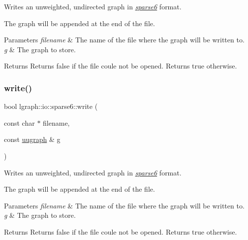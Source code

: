 Writes an unweighted, undirected graph in {\itshape \hyperlink{namespacelgraph_1_1io_1_1sparse6}{sparse6}} format. 

The graph will be appended at the end of the file. 
\begin{DoxyParams}{Parameters}
{\em filename} & The name of the file where the graph will be written to. \\
\hline
{\em g} & The graph to store. \\
\hline
\end{DoxyParams}
\begin{DoxyReturn}{Returns}
Returns false if the file coule not be opened. Returns true otherwise. 
\end{DoxyReturn}
\mbox{\label{namespacelgraph_1_1io_1_1sparse6_a851ea580cd4dd91e6239caa76f74b887}} 
\subsubsection{\texorpdfstring{write()}{write()}\hspace{0.1cm}{\footnotesize\ttfamily [2/2]}}
{\footnotesize\ttfamily bool lgraph\+::io\+::sparse6\+::write (\begin{DoxyParamCaption}\item[{const char $\ast$}]{filename,  }\item[{const \hyperlink{classlgraph_1_1uugraph}{uugraph} \&}]{g }\end{DoxyParamCaption})}



Writes an unweighted, undirected graph in {\itshape \hyperlink{namespacelgraph_1_1io_1_1sparse6}{sparse6}} format. 

The graph will be appended at the end of the file. 
\begin{DoxyParams}{Parameters}
{\em filename} & The name of the file where the graph will be written to. \\
\hline
{\em g} & The graph to store. \\
\hline
\end{DoxyParams}
\begin{DoxyReturn}{Returns}
Returns false if the file coule not be opened. Returns true otherwise. 
\end{DoxyReturn}
